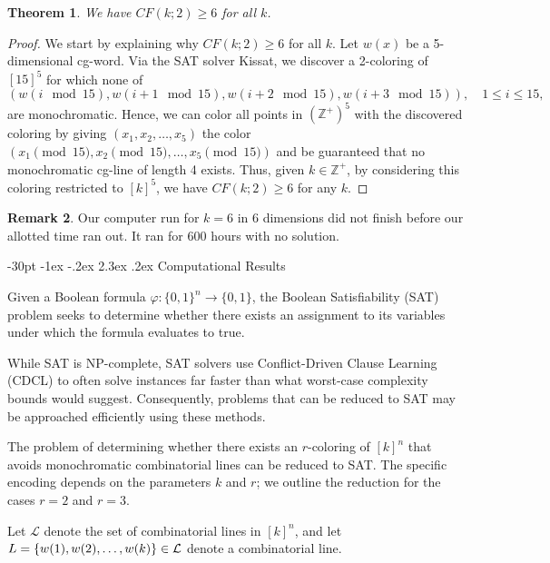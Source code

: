 \documentclass[11pt]{article}
\makeatletter
\newtheorem{thm}{Theorem}
\theoremstyle{definition}
\newtheorem{rem}[thm]{Remark}
\renewcommand\section{\@startsection {section}{1}{\z@}%
{-30pt \@plus -1ex \@minus -.2ex}%
{2.3ex \@plus.2ex}%
{\normalfont\normalsize\bfseries}}
\makeatother
\begin{document}
{
\begin{thm}  
We   have $CF(k;2) \geq 6$ for all $k$.
\end{thm}

\begin{proof}  We start by explaining why $CF(k;2) \geq 6$ for all $k$. Let $w(x)$ be a 5-dimensional cg-word.  Via the
SAT solver Kissat, we discover a 2-coloring of
$[15]^5$ for which none of
$$
(w(i \!\!\!\mod{15}), w(i+1 \!\!\!\mod{15}), w(i+2 \!\!\!\mod{15}), w(i+3 \!\!\!\mod{15})), \quad 1 \leq i \leq 15,
$$
are monochromatic.  Hence, we can color all points in
$(\mathbb{Z}^+)^5$ with the discovered coloring by
giving $(x_1,x_2,\dots,x_5)$ the color
$(x_1 \!\!\!\pmod{15}, x_2\!\!\!\pmod{15}, \dots, x_5 \!\!\!\pmod{15})$ and be guaranteed that no monochromatic
cg-line of length 4 exists.  Thus, given
$k \in \mathbb{Z}^+$, by considering this
coloring restricted to $[k]^5$, we have
$CF(k;2) \geq 6$ for any $k$.
\end{proof}


\begin{rem} Our computer run for $k=6$ in 6 dimensions did not
finish before our allotted time ran out.  It ran for 600 hours with
no solution.
\end{rem}


}





\section{Computational Results}\label{sec:comp}

Given a Boolean formula $\varphi: \{0,1\}^n \rightarrow \{0,1\}$, the Boolean Satisfiability (SAT) problem seeks to determine whether there exists an assignment to its variables under which the formula evaluates to true.


While SAT is NP-complete, SAT solvers use Conflict-Driven Clause Learning (CDCL) to often solve instances far faster than what worst-case complexity bounds would suggest. Consequently, problems that can be reduced to SAT may be approached efficiently using these methods.

The problem of determining whether there exists an $r$-coloring of $[k]^n$ that avoids monochromatic combinatorial lines can be reduced to SAT. The specific encoding depends on the parameters $k$ and $r$; we outline the reduction for the cases $r = 2$ and $r = 3$.

Let $\mathcal{L}$ denote the set of combinatorial lines in $[k]^n$, and let $L = \{w(1), w(2), \dots, \break w(k)\} \in \mathcal{L}$ denote a combinatorial line. 
\end{document}
